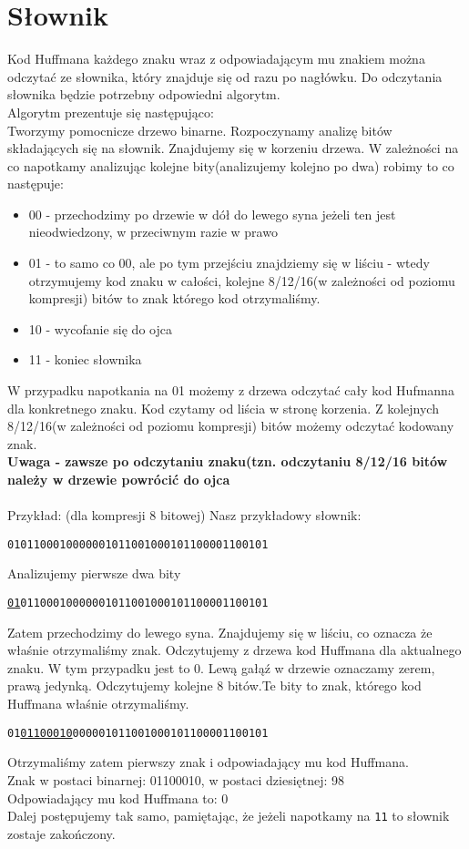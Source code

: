 \documentclass[]{article}
\begin{document}
\section{Słownik}\label{header-n279}
Kod Huffmana każdego znaku wraz z odpowiadającym mu znakiem można odczytać ze słownika, który znajduje się od razu po nagłówku. Do odczytania słownika będzie potrzebny odpowiedni algorytm.\\
Algorytm prezentuje się następująco:\\
Tworzymy pomocnicze drzewo binarne. Rozpoczynamy analizę bitów składających się na słownik. Znajdujemy się w korzeniu drzewa. W zależności na co napotkamy analizując kolejne bity(analizujemy kolejno po dwa) robimy to co następuje:
\begin{itemize}
    \item 00 - przechodzimy po drzewie w dół do lewego syna jeżeli ten jest nieodwiedzony, w przeciwnym razie w prawo
   \item  01 - to samo co 00, ale po tym przejściu znajdziemy się w liściu - wtedy otrzymujemy kod znaku w całości, kolejne 8/12/16(w zależności od poziomu kompresji) bitów to znak którego kod otrzymaliśmy.
   \item  10 - wycofanie się do ojca
   \item  11 - koniec słownika
\end{itemize}
W przypadku napotkania na 01 możemy z drzewa odczytać cały kod Hufmanna dla konkretnego znaku. Kod czytamy od liścia w stronę korzenia. Z kolejnych 8/12/16(w zależności od poziomu kompresji) bitów możemy odczytać kodowany znak. \\
\textbf{Uwaga - zawsze po odczytaniu znaku(tzn. odczytaniu 8/12/16 bitów należy w drzewie powrócić do ojca}
\\\\Przykład: (dla kompresji 8 bitowej)
Nasz przykładowy słownik:\\
\begin{center}
\texttt{0101100010000001011001000101100001100101}
\end{center}
Analizujemy pierwsze dwa bity
\begin{center}
\texttt{\underline{01}01100010000001011001000101100001100101}
\end{center}
Zatem przechodzimy do lewego syna. Znajdujemy się w liściu, co oznacza że właśnie otrzymaliśmy znak. Odczytujemy z drzewa kod Huffmana dla aktualnego znaku. W tym przypadku jest to 0. Lewą gałąź w drzewie oznaczamy zerem, prawą jedynką.
Odczytujemy kolejne 8 bitów.Te bity to znak, którego kod Huffmana właśnie otrzymaliśmy.
\begin{center}
\texttt{01\underline{01100010}000001011001000101100001100101}
\end{center}
Otrzymaliśmy zatem pierwszy znak i odpowiadający mu kod Huffmana.\\
Znak w postaci binarnej: 01100010, w postaci dziesiętnej: 98\\
Odpowiadający mu kod Huffmana to: 0\\
Dalej postępujemy tak samo, pamiętając, że jeżeli napotkamy na \texttt{11} to słownik zostaje zakończony.
\end{document}
